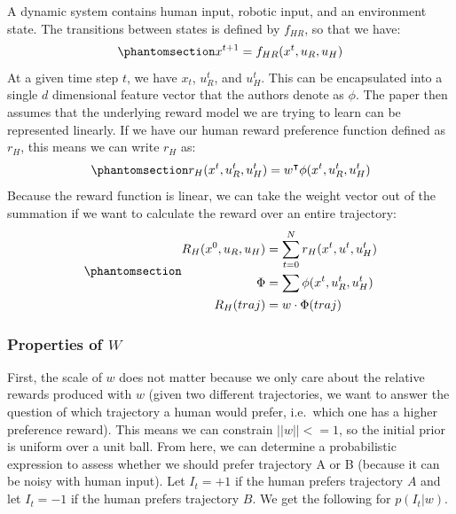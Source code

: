 \documentclass[
  letterpaper,
  numbers=noenddot,
  DIV=11]{scrreprt}
\theoremstyle{definition}
\theoremstyle{plain}
\theoremstyle{plain}
\theoremstyle{remark}
\begin{document}
A dynamic system contains human input, robotic input, and an environment
state. The transitions between states is defined by \(f_{HR}\), so that
we have:
\begin{equation}\phantomsection\label{eq-eq3.35}{x^{t+1} = f_{HR}(x^t, u_R, u_H)}\end{equation}
At a given time step \(t\), we have \(x_t\), \(u_R^t\), and \(u_H^t\).
This can be encapsulated into a single \(d\) dimensional feature vector
that the authors denote as \(\phi\). The paper then assumes that the
underlying reward model we are trying to learn can be represented
linearly. If we have our human reward preference function defined as
\(r_H\), this means we can write \(r_H\) as:
\begin{equation}\phantomsection\label{eq-eq3.35}{r_H(x^t, u_R^t, u_H^t) = w^{\intercal}\phi(x^t, u_R^t, u_H^t)}\end{equation}
Because the reward function is linear, we can take the weight vector out
of the summation if we want to calculate the reward over an entire
trajectory:
\begin{equation}\phantomsection\label{eq-eq3.36}{\begin{aligned}
R_{H}(x^0, u_R, u_H) &= \sum_{t=0}^{N} r_{H}(x^t, u^t, u_H^t)\\
\Phi &= \sum \phi(x^t, u_R^t, u_H^t)\\ 
R_H(traj) &= w\cdot\Phi(traj)\end{aligned}}\end{equation}

\subsubsection*{\texorpdfstring{Properties of
\(W\)}{Properties of W}}\label{properties-of-w}

First, the scale of \(w\) does not matter because we only care about the
relative rewards produced with \(w\) (given two different trajectories,
we want to answer the question of which trajectory a human would prefer,
i.e.~which one has a higher preference reward). This means we can
constrain \(||w|| <= 1\), so the initial prior is uniform over a unit
ball. From here, we can determine a probabilistic expression to assess
whether we should prefer trajectory A or B (because it can be noisy with
human input). Let \(I_t = +1\) if the human prefers trajectory \(A\) and
let \(I_t = -1\) if the human prefers trajectory \(B\). We get the
following for \(p(I_t | w)\).
\end{document}
